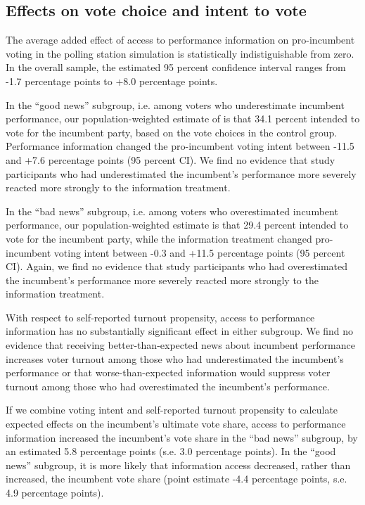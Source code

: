 \documentclass[11pt]{article}
\begin{document}
\subsection{Effects on vote choice and intent to vote}

The average added effect of access to performance information on pro-incumbent voting in the polling station simulation is statistically indistiguishable from zero. In the overall sample, the estimated 95 percent confidence interval ranges from -1.7 percentage points to +8.0 percentage points. 

In the ``good news'' subgroup, i.e. among voters who underestimate incumbent performance, our population-weighted estimate of is that 34.1 percent intended to vote for the incumbent party, based on the vote choices in the control group. Performance information changed the pro-incumbent voting intent between -11.5 and +7.6 percentage points (95 percent CI). We find no evidence that study participants who had underestimated the incumbent's performance more severely reacted more strongly to the information treatment. 

In the ``bad news'' subgroup, i.e. among voters who overestimated incumbent performance, our population-weighted estimate is that 29.4 percent intended to vote for the incumbent party, while the information treatment changed pro-incumbent voting intent between -0.3 and +11.5 percentage points (95 percent CI). Again, we find no evidence that study participants who had overestimated the incumbent's performance more severely reacted more strongly to the information treatment. 

With respect to self-reported turnout propensity, access to performance information has no substantially significant effect in either subgroup. We find no evidence that receiving better-than-expected news about incumbent performance increases voter turnout among those who had underestimated the incumbent's performance or that worse-than-expected information would suppress voter turnout among those who had overestimated the incumbent's performance.  

If we combine voting intent and self-reported turnout propensity to calculate expected effects on the incumbent's ultimate vote share, access to performance information increased the incumbent's vote share in the ``bad news'' subgroup, by an estimated 5.8 percentage points (s.e. 3.0 percentage points). In the ``good news'' subgroup, it is more likely that information access decreased, rather than increased, the incumbent vote share (point estimate -4.4 percentage points, s.e. 4.9 percentage points). 
\end{document}
